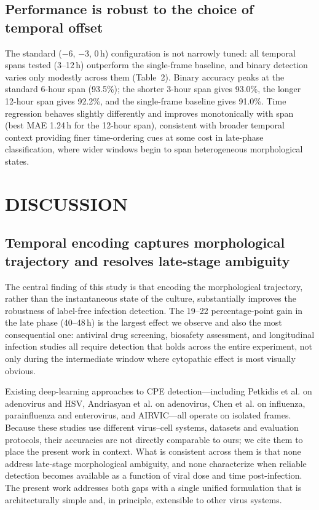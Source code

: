 \documentclass[12pt,letterpaper]{article}
\begin{document}
\subsection*{Performance is robust to the choice of temporal offset}

The standard ($-$6, $-$3, 0\,h) configuration is not narrowly tuned: all temporal spans tested (3--12\,h) outperform the single-frame baseline, and binary detection varies only modestly across them (Table~2). Binary accuracy peaks at the standard 6-hour span (93.5\%); the shorter 3-hour span gives 93.0\%, the longer 12-hour span gives 92.2\%, and the single-frame baseline gives 91.0\%. Time regression behaves slightly differently and improves monotonically with span (best MAE 1.24\,h for the 12-hour span), consistent with broader temporal context providing finer time-ordering cues at some cost in late-phase classification, where wider windows begin to span heterogeneous morphological states.

\section*{DISCUSSION}

\subsection*{Temporal encoding captures morphological trajectory and resolves late-stage ambiguity}

The central finding of this study is that encoding the morphological trajectory, rather than the instantaneous state of the culture, substantially improves the robustness of label-free infection detection. The 19--22 percentage-point gain in the late phase (40--48\,h) is the largest effect we observe and also the most consequential one: antiviral drug screening, biosafety assessment, and longitudinal infection studies all require detection that holds across the entire experiment, not only during the intermediate window where cytopathic effect is most visually obvious.

Existing deep-learning approaches to CPE detection---including Petkidis et al.\cite{ref-petkidis2024natcomm} on adenovirus and HSV, Andriasyan et al.\cite{ref-andriasyan2021iscience} on adenovirus, Chen et al.\cite{ref-chen2022biomedicines} on influenza, parainfluenza and enterovirus, and AIRVIC\cite{ref-airvic2025}---all operate on isolated frames. Because these studies use different virus--cell systems, datasets and evaluation protocols, their accuracies are not directly comparable to ours; we cite them to place the present work in context. What is consistent across them is that none address late-stage morphological ambiguity, and none characterize when reliable detection becomes available as a function of viral dose and time post-infection. The present work addresses both gaps with a single unified formulation that is architecturally simple and, in principle, extensible to other virus systems.
\end{document}
